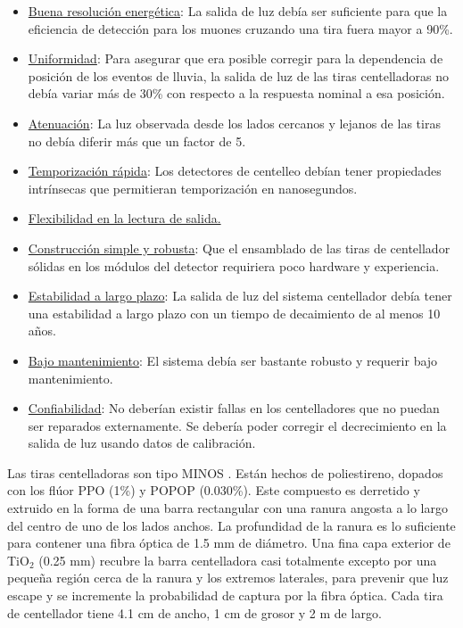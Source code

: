 \documentclass[a4paper,10pt]{article}
\numberwithin{equation}{section}
\begin{document}
\begin{itemize}
 \item \underline{Buena resolución energética}: La salida de luz debía ser suficiente 
 para que la eficiencia de detección para los muones cruzando una tira fuera mayor 
 a 90\%. 
 \item \underline{Uniformidad}: Para asegurar que era posible corregir para la dependencia 
 de posición de los eventos de lluvia, la salida de luz de las tiras centelladoras 
 no debía variar más de 30\% con respecto a la respuesta nominal a esa posición. 
 \item \underline{Atenuación}: La luz observada desde los lados cercanos y lejanos 
 de las tiras no debía diferir más que un factor de 5.
 \item \underline{Temporización rápida}: Los detectores de centelleo debían tener 
 propiedades intrínsecas que permitieran temporización en nanosegundos.
 \item \underline{Flexibilidad en la lectura de salida.}
 \item \underline{Construcción simple y robusta}: Que el ensamblado de las tiras 
 de centellador sólidas en los módulos del detector requiriera poco hardware y 
 experiencia.
 \item \underline{Estabilidad a largo plazo}: La salida de luz del sistema centellador 
 debía tener una estabilidad a largo plazo con un tiempo de decaimiento de al menos 
 10 años.
 \item \underline{Bajo mantenimiento}: El sistema debía ser bastante robusto y requerir 
 bajo mantenimiento.
 \item \underline{Confiabilidad}: No deberían existir fallas en los centelladores 
 que no puedan ser reparados externamente. Se debería poder corregir el decrecimiento 
 en la salida de luz usando datos de calibración. 
\end{itemize}

Las tiras centelladoras son tipo MINOS \cite{minos}. Están hechos de poliestireno, 
dopados con los flúor PPO (1\%) y POPOP (0.030\%). Este compuesto es derretido y 
extruido en la forma de una barra rectangular con una ranura angosta a lo largo del 
centro de uno de los lados anchos. La profundidad de la ranura es lo suficiente 
para contener una fibra óptica de 1.5 mm de diámetro. Una fina capa exterior de 
TiO$_2$ (0.25 mm) recubre la barra centelladora casi totalmente excepto por una 
pequeña región cerca de la ranura y los extremos laterales, para prevenir que luz 
escape y se incremente la probabilidad de captura por la fibra óptica. Cada tira 
de centellador tiene 4.1 cm de ancho, 1 cm de grosor y 2 m de largo.
\end{document}

